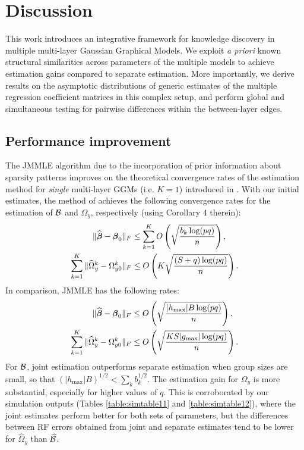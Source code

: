 \section{Discussion}
\label{sec:sec5}
This work introduces an integrative framework for knowledge discovery in multiple multi-layer Gaussian Graphical Models. We exploit {\it a priori} known structural similarities across parameters of the multiple models to achieve estimation gains compared to separate estimation. More importantly, we derive results on the asymptotic distributions of generic estimates of the multiple regression coefficient matrices in this complex setup, and perform global and simultaneous testing for pairwise differences within the between-layer edges.

\subsection{Performance improvement}
The JMMLE algorithm due to the incorporation of prior information about sparsity patterns improves on the theoretical convergence rates of the estimation method for {\it single} multi-layer GGMs (i.e. $K=1$) introduced in \citet{LinEtal16}. With our initial estimates, the method of \citet{LinEtal16} achieves the following convergence rates for the estimation of ${\cal{B}}$ and $\Omega_y$, respectively (using Corollary 4 therein):
%
\begin{align*}
\| \widehat {{\boldsymbol{\beta}}} - {\boldsymbol{\beta}}_0 \|_F & \leq \sum_{k=1}^K O \left( \sqrt{ \frac{ b_k \log (p q)}{n}} \right), \\
\sum_{k=1}^K \| \widehat \Omega_y^k - \Omega_{y0}^k \|_F & \leq O \left( K \sqrt{ \frac{ (S + q) \log (pq)}{n}} \right).
\end{align*}
%
In comparison, JMMLE has the following rates:
%
\begin{align*}
\| \widehat {{\boldsymbol{\beta}}} - {\boldsymbol{\beta}}_0 \|_F & \leq O \left( \sqrt{ \frac{ |h_{\max}| B \log (p q)}{n}} \right), \\
\sum_{k=1}^K \| \widehat \Omega_y^k - \Omega_{y0}^k \|_F & \leq O \left( \sqrt{ \frac{ KS |g_{\max}| \log (p q)}{n}} \right).
\end{align*}
%
For ${\cal{B}}$, joint estimation outperforms separate estimation when group sizes are small, so that $(| h_{\max}| B)^{1/2} < \sum_k b_k^{1/2}$. The estimation gain for $\Omega_y$ is more substantial, especially for higher values of $q$. This is corroborated by our simulation outputs (Tables \ref{table:simtable11} and \ref{table:simtable12}), where the joint estimates perform better for both sets of parameters, but the differences between RF errors obtained from joint and separate estimates tend to be lower for $\widehat \Omega_y$ than $\widehat {{\cal{B}}}$.

